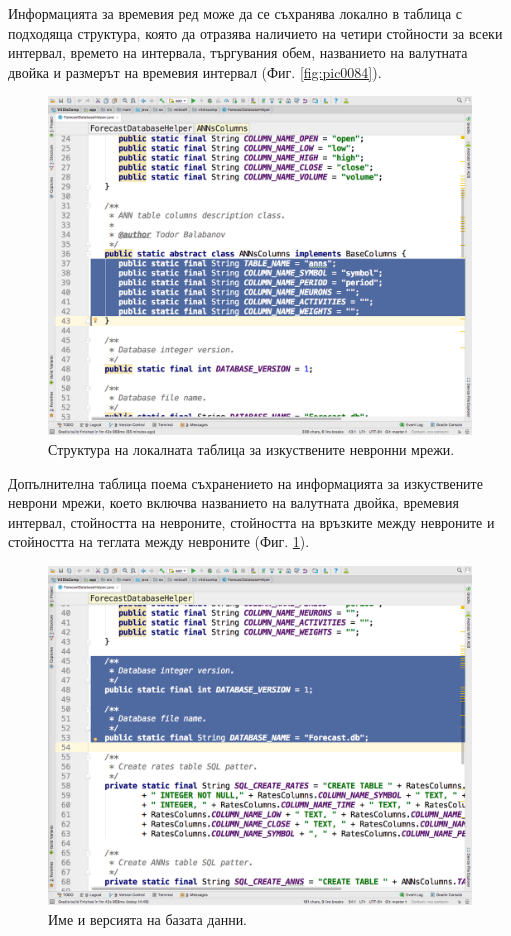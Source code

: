 \documentclass[book,14pt,oneside,openany]{memoir}
\begin{document}
Информацията за времевия ред може да се съхранява локално в таблица с подходяща структура, която да отразява наличието на четири стойности за всеки интервал, времето на интервала, търгувания обем, названието на валутната двойка и размерът на времевия интервал (Фиг. \ref{fig:pic0084}).

\begin{figure}[h]
  \centering
  \includegraphics[height=0.45\pdfpageheight]{pic0085}
  \caption{Структура на локалната таблица за изкуствените невронни мрежи.}
\label{fig:pic0085}
\end{figure}
\FloatBarrier

Допълнителна таблица поема съхранението на информацията за изкуствените неврони мрежи, което включва названието на валутната двойка, времевия интервал, стойността на невроните, стойността на връзките между невроните и стойността на теглата между невроните (Фиг. \ref{fig:pic0085}). 

\begin{figure}[h]
  \centering
  \includegraphics[height=0.45\pdfpageheight]{pic0086}
  \caption{Име и версията на базата данни.}
\label{fig:pic0086}
\end{figure}
\FloatBarrier
\end{document}
